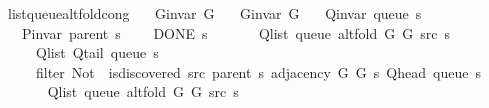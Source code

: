 \begin{isabellebody}
%
\endisatagdocument
{\isafolddocument}%
%
\isadelimdocument
%
\endisadelimdocument
{}\isamarkupfalse%
\ list{\isacharunderscore}{\kern0pt}queue{\isacharunderscore}{\kern0pt}alt{\isacharunderscore}{\kern0pt}fold{\isacharunderscore}{\kern0pt}cong{\isacharcolon}{\kern0pt}\isanewline
\ \ \ {\isachardoublequoteopen}G{\isachardot}{\kern0pt}invar\ G{}{\isachardoublequoteclose}\isanewline
\ \ \ {\isachardoublequoteopen}G{\isachardot}{\kern0pt}invar\ G{}{\isachardoublequoteclose}\isanewline
\ \ \ {\isachardoublequoteopen}Q{\isacharunderscore}{\kern0pt}invar\ {\isacharparenleft}{\kern0pt}queue\ s{\isacharparenright}{\kern0pt}{\isachardoublequoteclose}\isanewline
\ \ \ {\isachardoublequoteopen}P{\isacharunderscore}{\kern0pt}invar\ {\isacharparenleft}{\kern0pt}parent\ s{\isacharparenright}{\kern0pt}{\isachardoublequoteclose}\isanewline
\ \ \ {\isachardoublequoteopen}{\isasymnot}\ DONE\ s{\isachardoublequoteclose}\isanewline
\ \ \isanewline
\ \ \ \ {\isachardoublequoteopen}Q{\isacharunderscore}{\kern0pt}list\ {\isacharparenleft}{\kern0pt}queue\ {\isacharparenleft}{\kern0pt}alt{\isacharunderscore}{\kern0pt}fold\ G{}\ G{}\ src\ s{\isacharparenright}{\kern0pt}{\isacharparenright}{\kern0pt}\ {\isacharequal}{\kern0pt}\isanewline
\ \ \ \ \ Q{\isacharunderscore}{\kern0pt}list\ {\isacharparenleft}{\kern0pt}Q{\isacharunderscore}{\kern0pt}tail\ {\isacharparenleft}{\kern0pt}queue\ s{\isacharparenright}{\kern0pt}{\isacharparenright}{\kern0pt}\ {\isacharat}{\kern0pt}\isanewline
\ \ \ \ \ filter\ {\isacharparenleft}{\kern0pt}Not\ {\isasymcirc}\ is{\isacharunderscore}{\kern0pt}discovered\ src\ {\isacharparenleft}{\kern0pt}parent\ s{\isacharparenright}{\kern0pt}{\isacharparenright}{\kern0pt}\ {\isacharparenleft}{\kern0pt}adjacency\ G{}\ G{}\ s\ {\isacharparenleft}{\kern0pt}Q{\isacharunderscore}{\kern0pt}head\ {\isacharparenleft}{\kern0pt}queue\ s{\isacharparenright}{\kern0pt}{\isacharparenright}{\kern0pt}{\isacharparenright}{\kern0pt}{\isachardoublequoteclose}\isanewline
%
\isadelimproof
%
\endisadelimproof
%
\isatagproof
{}\isamarkupfalse%
\ {\isacharminus}{\kern0pt}\isanewline
\ \ \isamarkupfalse%
\isanewline
\ \ \ \ {\isachardoublequoteopen}Q{\isacharunderscore}{\kern0pt}list\ {\isacharparenleft}{\kern0pt}queue\ {\isacharparenleft}{\kern0pt}alt{\isacharunderscore}{\kern0pt}fold\ G{}\ G{}\ src\ s{\isacharparenright}{\kern0pt}{\isacharparenright}{\kern0pt}\ {\isacharequal}{\kern0pt}\isanewline

\end{isabellebody}
